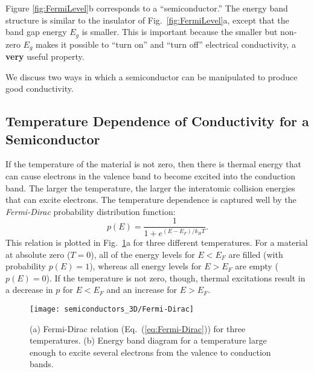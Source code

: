 Figure \ref{fig:FermiLevel}b corresponds to a ``semiconductor.'' The
energy band structure is similar to the insulator of Fig.~\ref{fig:FermiLevel}a,
except that the band gap energy $E_g$ is smaller. This is important because
the smaller but non-zero $E_g$ makes it possible to ``turn on'' and ``turn off''
electrical conductivity, a {\bf very} useful property.

We discuss two ways in which a semiconductor can be manipulated to
produce good conductivity.

\subsection{Temperature Dependence of Conductivity for a Semiconductor}

If the temperature of the material is not zero, then there is
thermal energy that can cause electrons in the valence band to 
become excited into the conduction band. The larger the temperature,
the larger the interatomic collision energies that can excite electrons.
The temperature dependence is captured well by the {\it Fermi-Dirac}
probability distribution function:
\begin{equation}
p(E) = \frac{1}{1+e^{(E-E_F)/k_BT}} .
\label{eq:Fermi-Dirac}
\end{equation}
This relation is plotted in Fig.~\ref{fig:Fermi-Dirac}a for three
different temperatures.  For a material at absolute zero ($T = 0$), all
of the energy levels for $E < E_F$ are filled (with probability $p(E) = 1$),
whereas all energy levels for $E > E_F$ are empty ($p(E) = 0$).
If the temperature is not zero, though, thermal excitations result in
a decrease in $p$ for $E < E_F$ and an increase for $E > E_F$.

\begin{figure}
\begin{center}
\texttt{[image: semiconductors\_3D/Fermi-Dirac]}
\end{center} 
\caption{(a) Fermi-Dirac relation (Eq.~(\ref{eq:Fermi-Dirac})) for
three temperatures. (b) Energy band diagram for a temperature large
enough to excite several electrons from the valence to conduction bands.} 
\label{fig:Fermi-Dirac} 
\end{figure}

